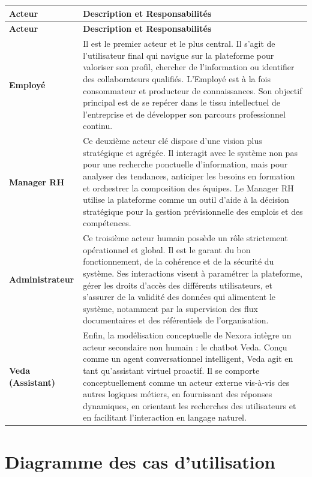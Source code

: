 \documentclass[12pt,a4paper]{article}
\begin{document}
\begin{longtable}{|p{3cm}|p{10.5cm}|}
\toprule
\rowcolor{bleu!15}
\textbf{Acteur} & \textbf{Description et Responsabilités} \\
\midrule
\endfirsthead
\toprule
\rowcolor{bleu!15}
\textbf{Acteur} & \textbf{Description et Responsabilités} \\
\midrule
\endhead
\textbf{Employé} & Il est le premier acteur et le plus central. Il s'agit de l'utilisateur final qui navigue sur la plateforme pour valoriser son profil, chercher de l'information ou identifier des collaborateurs qualifiés. L'Employé est à la fois consommateur et producteur de connaissances. Son objectif principal est de se repérer dans le tissu intellectuel de l'entreprise et de développer son parcours professionnel continu. \\
\midrule
\textbf{Manager RH} & Ce deuxième acteur clé dispose d'une vision plus stratégique et agrégée. Il interagit avec le système non pas pour une recherche ponctuelle d'information, mais pour analyser des tendances, anticiper les besoins en formation et orchestrer la composition des équipes. Le Manager RH utilise la plateforme comme un outil d'aide à la décision stratégique pour la gestion prévisionnelle des emplois et des compétences. \\
\midrule
\textbf{Administrateur} & Ce troisième acteur humain possède un rôle strictement opérationnel et global. Il est le garant du bon fonctionnement, de la cohérence et de la sécurité du système. Ses interactions visent à paramétrer la plateforme, gérer les droits d'accès des différents utilisateurs, et s'assurer de la validité des données qui alimentent le système, notamment par la supervision des flux documentaires et des référentiels de l'organisation. \\
\midrule
\textbf{Veda (Assistant)} & Enfin, la modélisation conceptuelle de Nexora intègre un acteur secondaire non humain : le chatbot Veda. Conçu comme un agent conversationnel intelligent, Veda agit en tant qu'assistant virtuel proactif. Il se comporte conceptuellement comme un acteur externe vis-à-vis des autres logiques métiers, en fournissant des réponses dynamiques, en orientant les recherches des utilisateurs et en facilitant l'interaction en langage naturel. \\
\bottomrule
\end{longtable}

\section{Diagramme des cas d'utilisation}
\end{document}
